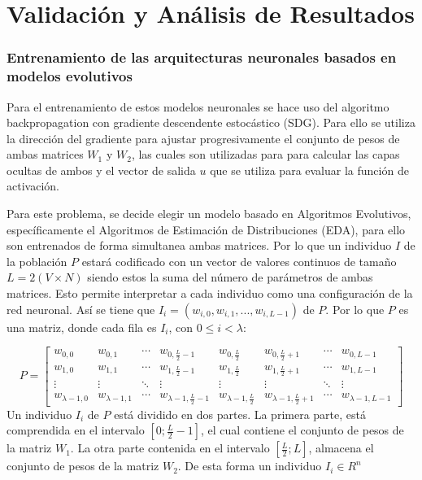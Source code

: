 \chapter{Validación y Análisis de Resultados}
\label{chap:chapter3}
\subsection{Entrenamiento de las arquitecturas neuronales basados en modelos evolutivos}\label{seq_3}

Para el entrenamiento de estos modelos neuronales se hace uso del algoritmo backpropagation con gradiente descendente estocástico (SDG). Para ello se utiliza la dirección del gradiente para ajustar progresivamente el conjunto de pesos de ambas matrices $W_{1}$ y $W_2$, las cuales son utilizadas para para calcular las capas ocultas de ambos y el vector de salida $u$ que se utiliza para evaluar la función de activación.

Para este problema, se decide elegir un modelo basado en Algoritmos Evolutivos, específicamente el Algoritmos de Estimación de Distribuciones (EDA), para ello son entrenados de forma simultanea ambas matrices. Por lo que un individuo $I$ de la población $P$ estará codificado con un vector de valores continuos de tamaño $L=2(V \times N)$ siendo estos la suma del número de parámetros de ambas matrices. Esto permite interpretar a cada individuo como una configuración de la red neuronal. Así se tiene que $I_{i}=(w_{i,0},w_{i,1},...,w_{i,L-1})$ de $P$. Por lo que $P$ es una matriz, donde cada fila es $I_{i}$, con $0 \le i < \lambda$:

\begin{equation}
P=
\begin{bmatrix}
w_{0,0} & w_{0,1} & \cdots & w_{0,\frac{L}{2}-1} & w_{0,\frac{L}{2}} & w_{0,\frac{L}{2}+1} & \cdots &  w_{0,L-1}\\
w_{1,0} & w_{1,1} & \cdots & w_{1,\frac{L}{2}-1} & w_{1,\frac{L}{2}} & w_{1,\frac{L}{2}+1} & \cdots &  w_{1,L-1}\\	
\vdots & \vdots & \ddots & \vdots & \vdots & \vdots & \ddots & \vdots \\
w_{\lambda-1,0} & w_{\lambda-1,1} & \cdots & w_{\lambda-1,\frac{L}{2}-1} & w_{\lambda-1,\frac{L}{2}} & w_{\lambda-1,\frac{L}{2}+1} & \cdots &  w_{\lambda-1,L-1}
\end{bmatrix}
\end{equation}
Un individuo $I_{i}$ de $P$ está dividido en dos partes. La primera parte, está comprendida en el intervalo $[0;\frac{L}{2}-1]$, el cual contiene el conjunto de pesos de la matriz $W_{1}$. La otra parte contenida en el intervalo $[\frac{L}{2};L]$, almacena el conjunto de pesos de la matriz $W_{2}$. De esta forma un individuo $I_{i} \in R^{n}$  

